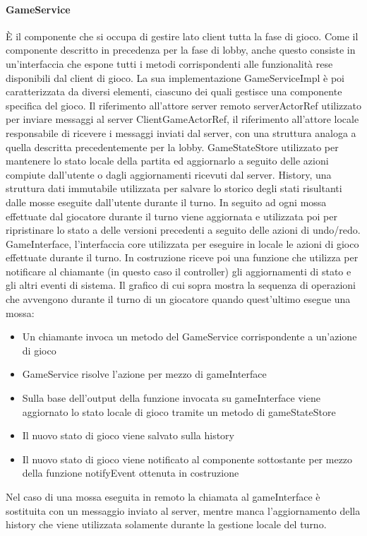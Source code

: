 \paragraph{GameService}
È il componente che si occupa di gestire lato client tutta la fase di gioco. Come il componente descritto in precedenza per la fase di lobby, anche questo consiste in un’interfaccia che espone tutti i metodi corrispondenti alle funzionalità rese disponibili dal client di gioco.
La sua implementazione GameServiceImpl è poi caratterizzata da diversi elementi, ciascuno dei quali gestisce una componente specifica del gioco.
Il riferimento all’attore server remoto serverActorRef utilizzato per inviare messaggi al server
ClientGameActorRef, il riferimento all’attore locale responsabile di ricevere i messaggi inviati dal server, con una struttura analoga a quella descritta precedentemente per la lobby.
GameStateStore utilizzato per mantenere lo stato locale della partita ed aggiornarlo a seguito delle azioni compiute dall’utente o dagli aggiornamenti ricevuti dal server.
History, una struttura dati immutabile utilizzata per salvare lo storico degli stati risultanti dalle mosse eseguite dall’utente durante il turno. In seguito ad ogni mossa effettuate dal giocatore durante il turno viene aggiornata e utilizzata poi per ripristinare lo stato a delle versioni precedenti a seguito delle azioni di undo/redo.
GameInterface, l’interfaccia core utilizzata per eseguire in locale le azioni di gioco effettuate durante il turno.
In costruzione riceve poi una funzione che utilizza per notificare al chiamante (in questo caso il controller) gli aggiornamenti di stato e gli altri eventi di sistema.
Il grafico di cui sopra mostra la sequenza di operazioni che avvengono durante il turno di un giocatore quando quest’ultimo esegue una mossa:
\begin{itemize}
    \item Un chiamante invoca un metodo del GameService corrispondente a un’azione di gioco
    \item GameService risolve l’azione per mezzo di gameInterface
    \item Sulla base dell’output della funzione invocata su gameInterface viene aggiornato lo stato locale di gioco tramite un metodo di gameStateStore
    \item Il nuovo stato di gioco viene salvato sulla history
    \item Il nuovo stato di gioco viene notificato al componente sottostante per mezzo della funzione notifyEvent ottenuta in costruzione
\end{itemize}
Nel caso di una mossa eseguita in remoto la chiamata al gameInterface è sostituita con un messaggio inviato al server, mentre manca l’aggiornamento della history che viene utilizzata solamente durante la gestione locale del turno.

